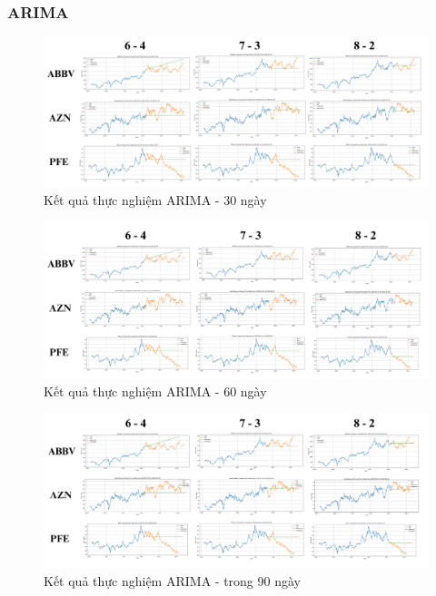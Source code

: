 \documentclass[conference]{IEEEtran}
\begin{document}
\subsubsection{ARIMA}
\begin{figure}[H]
    \centering
    \begin{minipage}{0.5\textwidth}
    \centering
    \includegraphics[width=1\textwidth]{Image/ARIMA30.png}
    \caption{Kết quả thực nghiệm ARIMA - 30 ngày}
    \label{fig:arima30}
    \end{minipage}
\end{figure}
\vspace{-15pt}
\begin{figure}[H]
    \centering
    \begin{minipage}{0.5\textwidth}
    \centering
    \includegraphics[width=1\textwidth]{Image/ARIMA60.png}
    \caption{Kết quả thực nghiệm ARIMA - 60 ngày}
    \label{fig:arima60}
    \end{minipage}
\end{figure}
\vspace{-10pt}
\begin{figure}[H]
    \centering
    \begin{minipage}{0.5\textwidth}
    \centering
    \includegraphics[width=1\textwidth]{Image/ARIMA90.png}
    \caption{Kết quả thực nghiệm ARIMA - trong 90 ngày}
    \label{fig:1}
    \end{minipage}
\end{figure}
\vspace{-20pt}
\end{document}
